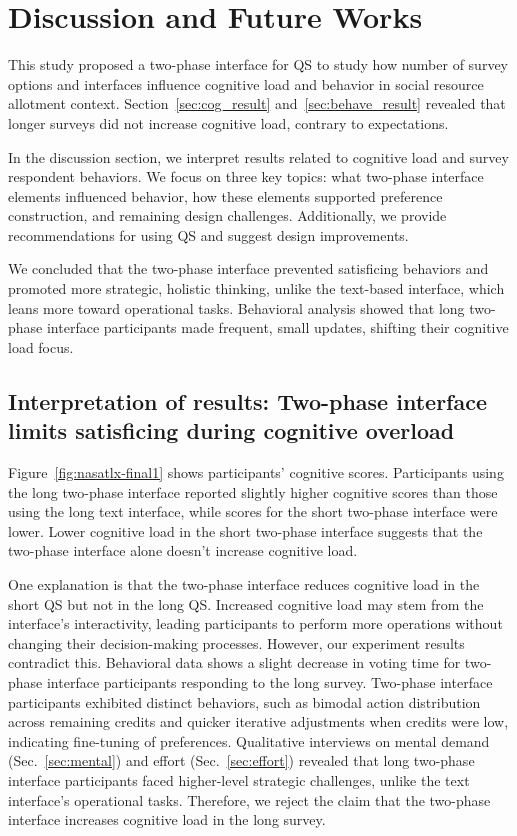 \section{Discussion and Future Works}
\label{sec:discussion}
This study proposed a two-phase interface for QS to study how number of survey options and interfaces influence cognitive load and behavior in social resource allotment context. Section~\ref{sec:cog_result} and~\ref{sec:behave_result} revealed that longer surveys did not increase cognitive load, contrary to expectations.

In the discussion section, we interpret results related to cognitive load and survey respondent behaviors. We focus on three key topics: what two-phase interface elements influenced behavior, how these elements supported preference construction, and remaining design challenges. Additionally, we provide recommendations for using QS and suggest design improvements.

We concluded that the two-phase interface prevented satisficing behaviors and promoted more strategic, holistic thinking, unlike the text-based interface, which leans more toward operational tasks. Behavioral analysis showed that long two-phase interface participants made frequent, small updates, shifting their cognitive load focus.

\subsection{Interpretation of results: Two-phase interface limits satisficing during cognitive overload} \label{sec:satisficing}
Figure~\ref{fig:nasatlx-final1} shows participants' cognitive scores. Participants using the long two-phase interface reported slightly higher cognitive scores than those using the long text interface, while scores for the short two-phase interface were lower. Lower cognitive load in the short two-phase interface suggests that the two-phase interface alone doesn't increase cognitive load.

One explanation is that the two-phase interface reduces cognitive load in the short QS but not in the long QS. Increased cognitive load may stem from the interface's interactivity, leading participants to perform more operations without changing their decision-making processes. However, our experiment results contradict this. Behavioral data shows a slight decrease in voting time for two-phase interface participants responding to the long survey. Two-phase interface participants exhibited distinct behaviors, such as bimodal action distribution across remaining credits and quicker iterative adjustments when credits were low, indicating fine-tuning of preferences. Qualitative interviews on mental demand (Sec.~\ref{sec:mental}) and effort (Sec.~\ref{sec:effort}) revealed that long two-phase interface participants faced higher-level strategic challenges, unlike the text interface's operational tasks. Therefore, we reject the claim that the two-phase interface increases cognitive load in the long survey.

